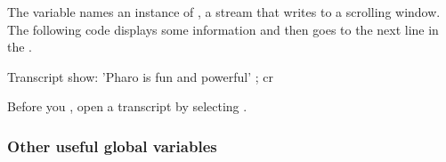 \documentclass[a4paper,10pt,twoside]{book}
\begin{document}
The variable  names an instance of , a stream that writes to a scrolling window.
The following code displays some information and then goes to the next line in the .

\begin{code}{}
Transcript show: 'Pharo is fun and powerful' ; cr
\end{code}

\noindent
Before you , open a transcript by selecting .


\subsubsection{Other useful global variables}
\end{document}
